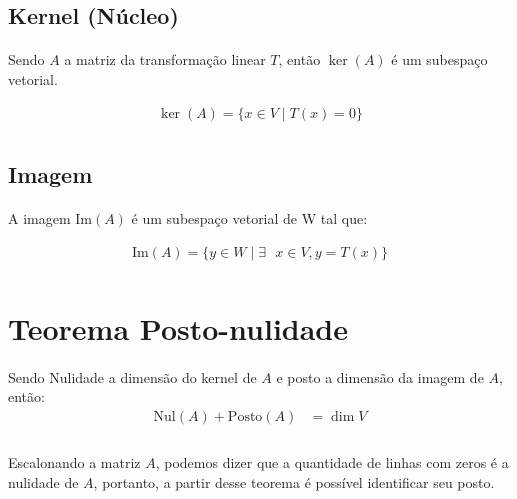 \documentclass{article}
\newcommand{\kernel}[1] {\ker \left( #1 \right)}
\newcommand{\imagem}[1] {\text{Im} \left( #1 \right)}
\newcommand{\posto}[1] {\text{Posto} \left( #1 \right)}
\newcommand{\nul}[1] {\text{Nul} \left( #1 \right)}
\begin{document}
        \subsection{Kernel (Núcleo)}
            \paragraph{}
            Sendo $A$ a matriz da transformação linear $T$, então $\kernel{A}$ é um subespaço vetorial.

            \begin{align*}
                \kernel{A} = \{x \in V \mid T(x) = 0\}\\
            \end{align*}

        \subsection{Imagem}
            \paragraph{}
            A  imagem $\imagem{A}$ é um subespaço vetorial de W tal que: 

            \begin{align*}
                \imagem{A} = \{ y \in W \mid \exists\text{ } x \in V, y = T(x) \}\\
            \end{align*}

    \section{Teorema Posto-nulidade}
        \paragraph{}
        Sendo Nulidade a dimensão do kernel de $A$ e posto a dimensão da imagem de $A$, então:
        \begin{align*}
            \nul{A} + \posto{A} &= \dim{V}\\
        \end{align*}

        \paragraph{}
        Escalonando a matriz $A$, podemos dizer que a quantidade de linhas com zeros é a nulidade de $A$, portanto, a partir desse
        teorema é possível identificar seu posto.
\end{document}
